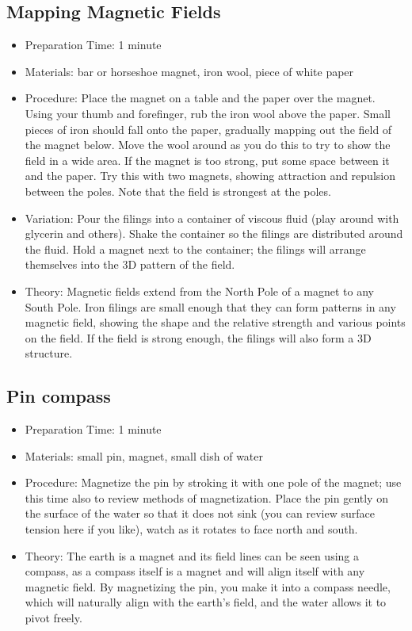 \subsection{Mapping Magnetic Fields}
\begin{itemize}
\item{Preparation Time: 1 minute}
\item{Materials: bar or horseshoe magnet, iron wool, piece of white paper}
\item{Procedure: Place the magnet on a table and the paper over the magnet. Using your thumb and forefinger, rub the iron wool above the paper. Small pieces of iron should fall onto the paper, gradually mapping out the field of the magnet below. Move the wool around as you do this to try to show the field in a wide area. If the magnet is too strong, put some space between it and the paper. Try this with two magnets, showing attraction and repulsion between the poles. Note that the field is strongest at the poles.}
\item{Variation: Pour the filings into a container of viscous fluid (play around with glycerin and others). Shake the container so the filings are distributed around the fluid. Hold a magnet next to the container; the filings will arrange themselves into the 3D pattern of the field.}
\item{Theory: Magnetic fields extend from the North Pole of a magnet to any South Pole. Iron filings are small enough that they can form patterns in any magnetic field, showing the shape and the relative strength and various points on the field. If the field is strong enough, the filings will also form a 3D structure.}
\end{itemize}

\subsection{Pin compass}
\begin{itemize}
\item{Preparation Time: 1 minute}
\item{Materials: small pin, magnet, small dish of water}
\item{Procedure: Magnetize the pin by stroking it with one pole of the magnet; use this time also to review methods of magnetization. Place the pin gently on the surface of the water so that it does not sink (you can review surface tension here if you like), watch as it rotates to face north and south.}
\item{Theory: The earth is a magnet and its field lines can be seen using a compass, as a compass itself is a magnet and will align itself with any magnetic field. By magnetizing the pin, you make it into a compass needle, which will naturally align with the earth’s field, and the water allows it to pivot freely.}
\end{itemize}

